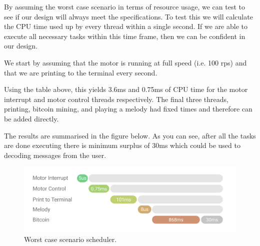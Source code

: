 \documentclass{article}
\begin{document}
\noindent
By assuming the worst case scenario in terms of resource usage, we can test to see if our design will always meet the specifications.
To test this we will calculate the CPU time used up by every thread within a single second. If we are able to execute all necessary tasks within this time frame, then we can be confident in our design.

\bigskip

\noindent
We start by assuming that the motor is running at full speed (i.e. 100 rps) and that we are printing to the terminal every second.

\bigskip

\noindent
Using the table above, this yields 3.6ms and 0.75ms of CPU time for the motor interrupt and motor control threads respectively.
The final three threads, printing, bitcoin mining, and playing a melody had fixed times and therefore can be added directly.

\bigskip

\noindent
The results are summarised in the figure below. As you can see, after all the tasks are done executing there is minimum surplus of 30ms which could be used to decoding messages from the user.


\begin{figure}[H]
\begin{center}
   \includegraphics[width=0.9\linewidth]{scheduler.png}
\end{center}
   \caption{Worst case scenario scheduler.}
\label{fig:long}
\label{fig:onecol}
\end{figure}
\end{document}
